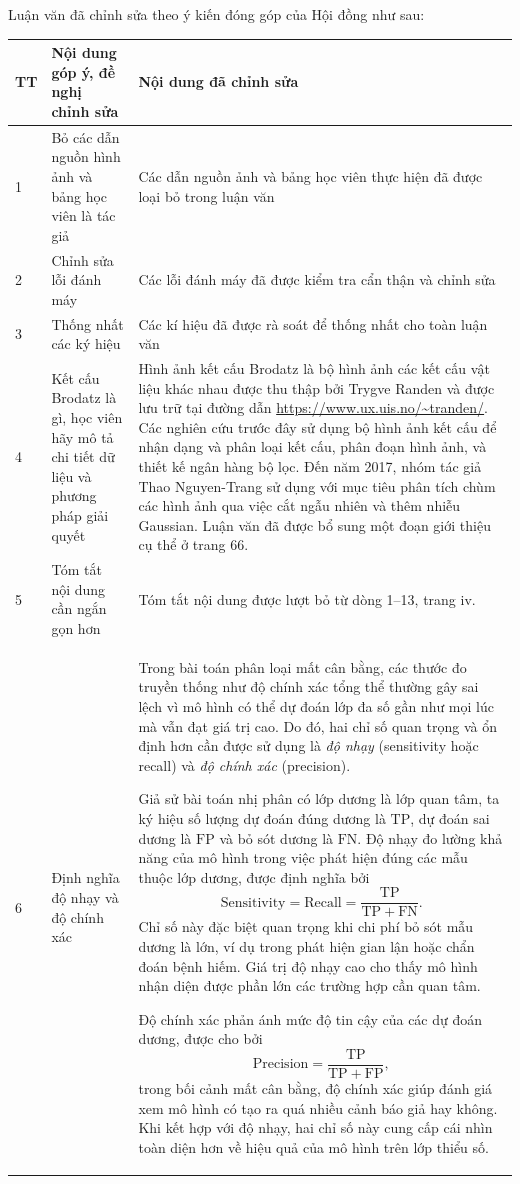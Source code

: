 \documentclass[a4paper,oneside]{article} %
\begin{document}
	\vspace{20pt}
	Luận văn đã chỉnh sửa theo ý kiến đóng góp của Hội đồng như sau:
{	\small
	\begin{longtable}{p{0.5cm}p{5cm}p{9cm}}
		
		\toprule
		\bf TT & \bf Nội dung góp ý, đề nghị chỉnh sửa  & \bf Nội dung đã chỉnh sửa\\
		\midrule
		1 &Bỏ các dẫn nguồn hình ảnh và bảng học viên là tác giả& Các dẫn nguồn ảnh và bảng học viên thực hiện đã được loại bỏ trong luận văn\\
		2 &Chỉnh sửa lỗi đánh máy & Các lỗi đánh máy đã được kiểm tra cẩn thận và chỉnh sửa\\
		3 & Thống nhất các ký hiệu & Các kí hiệu đã được rà soát để thống nhất cho toàn luận văn\\ 
		4 & Kết cấu Brodatz là gì, học viên hãy mô tả chi tiết dữ liệu và phương pháp giải quyết & Hình ảnh kết cấu Brodatz là bộ hình ảnh các kết cấu vật liệu khác nhau được thu thập bởi Trygve Randen và được lưu trữ tại đường dẫn \url{https://www.ux.uis.no/~tranden/}. Các nghiên cứu trước đây sử dụng bộ hình ảnh kết cấu để nhận dạng và phân loại kết cấu, phân đoạn hình ảnh, và thiết kế ngân hàng bộ lọc. Đến năm 2017, nhóm tác giả Thao Nguyen-Trang sử dụng với mục tiêu phân tích chùm các hình ảnh qua việc cắt ngẫu nhiên và thêm nhiễu Gaussian. Luận văn đã  được bổ sung một đoạn giới thiệu cụ thể ở trang 66.\\
		5 & Tóm tắt nội dung cần ngắn gọn hơn &  Tóm tắt nội dung được lượt bỏ từ dòng 1--13, trang iv. \\
		6 & Định nghĩa độ nhạy và độ chính xác &  Trong bài toán phân loại mất cân bằng, các thước đo truyền thống như độ chính xác tổng thể thường gây sai lệch vì mô hình có thể dự đoán lớp đa số gần như mọi lúc mà vẫn đạt giá trị cao. Do đó, hai chỉ số quan trọng và ổn định hơn cần được sử dụng là \emph{độ nhạy} (sensitivity hoặc recall) và \emph{độ chính xác} (precision). 
		
		Giả sử bài toán nhị phân có lớp dương là lớp quan tâm, ta ký hiệu số lượng dự đoán đúng dương là $\mathrm{TP}$, dự đoán sai dương là $\mathrm{FP}$ và bỏ sót dương là $\mathrm{FN}$. Độ nhạy đo lường khả năng của mô hình trong việc phát hiện đúng các mẫu thuộc lớp dương, được định nghĩa bởi
		\[
		\mathrm{Sensitivity}=\mathrm{Recall}
		=\frac{\mathrm{TP}}{\mathrm{TP}+\mathrm{FN}}.
		\]
		Chỉ số này đặc biệt quan trọng khi chi phí bỏ sót mẫu dương là lớn, ví dụ trong phát hiện gian lận hoặc chẩn đoán bệnh hiếm. Giá trị độ nhạy cao cho thấy mô hình nhận diện được phần lớn các trường hợp cần quan tâm.
		
		Độ chính xác phản ánh mức độ tin cậy của các dự đoán dương, được cho bởi
		\[
		\mathrm{Precision}=\frac{\mathrm{TP}}{\mathrm{TP}+\mathrm{FP}},
		\]
		trong bối cảnh mất cân bằng, độ chính xác giúp đánh giá xem mô hình có tạo ra quá nhiều cảnh báo giả hay không. Khi kết hợp với độ nhạy, hai chỉ số này cung cấp cái nhìn toàn diện hơn về hiệu quả của mô hình trên lớp thiểu số. \\
		\bottomrule
\end{longtable}
}
	
\end{document}
